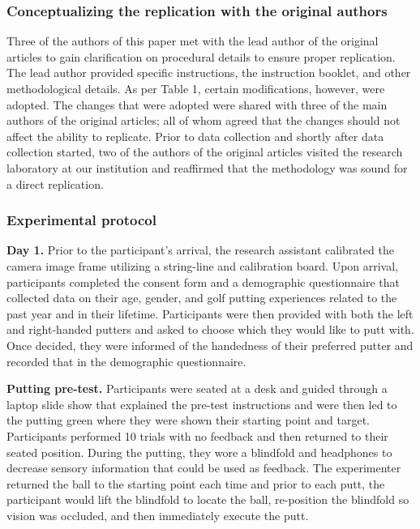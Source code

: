 \documentclass[
  english,
  man,floatsintext]{apa7}
\begin{document}
\hypertarget{conceptualizing-the-replication-with-the-original-authors}{%
\subsubsection{Conceptualizing the replication with the original authors}\label{conceptualizing-the-replication-with-the-original-authors}}

Three of the authors of this paper met with the lead author of the original articles to gain clarification on procedural details to ensure proper replication. The lead author provided specific instructions, the instruction booklet, and other methodological details. As per Table 1, certain modifications, however, were adopted. The changes that were adopted were shared with three of the main authors of the original articles; all of whom agreed that the changes should not affect the ability to replicate. Prior to data collection and shortly after data collection started, two of the authors of the original articles visited the research laboratory at our institution and reaffirmed that the methodology was sound for a direct replication.

\hypertarget{experimental-protocol}{%
\subsubsection{Experimental protocol}\label{experimental-protocol}}

\textbf{Day 1.} Prior to the participant's arrival, the research assistant calibrated the camera image frame utilizing a string-line and calibration board. Upon arrival, participants completed the consent form and a demographic questionnaire that collected data on their age, gender, and golf putting experiences related to the past year and in their lifetime. Participants were then provided with both the left and right-handed putters and asked to choose which they would like to putt with. Once decided, they were informed of the handedness of their preferred putter and recorded that in the demographic questionnaire.

\textbf{Putting pre-test.} Participants were seated at a desk and guided through a laptop slide show that explained the pre-test instructions and were then led to the putting green where they were shown their starting point and target. Participants performed 10 trials with no feedback and then returned to their seated position. During the putting, they wore a blindfold and headphones to decrease sensory information that could be used as feedback. The experimenter returned the ball to the starting point each time and prior to each putt, the participant would lift the blindfold to locate the ball, re-position the blindfold so vision was occluded, and then immediately execute the putt.
\end{document}
